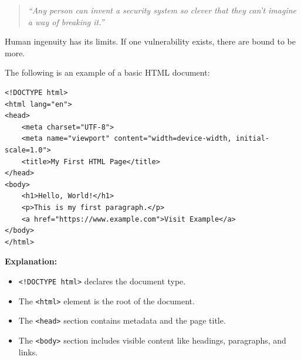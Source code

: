     \begin{theo}

        \label{theo:schneier}
        \begin{quote}
            \emph{``Any person can invent a security system so clever that they can't imagine a way of breaking it.''}
        \end{quote}

        \vspace{.5em}
        \noindent
        Human ingenuity has its limits. If one vulnerability exists, there are bound to be more. \hfill
    \end{theo}

    \newpage
    
\begin{Example}
The following is an example of a basic HTML document:

\begin{verbatim}
<!DOCTYPE html>
<html lang="en">
<head>
    <meta charset="UTF-8">
    <meta name="viewport" content="width=device-width, initial-scale=1.0">
    <title>My First HTML Page</title>
</head>
<body>
    <h1>Hello, World!</h1>
    <p>This is my first paragraph.</p>
    <a href="https://www.example.com">Visit Example</a>
</body>
</html>
\end{verbatim}

\noindent
\textbf{Explanation:}
\begin{itemize}
    \item \texttt{<!DOCTYPE html>} declares the document type.
    \item The \texttt{<html>} element is the root of the document.
    \item The \texttt{<head>} section contains metadata and the page title.
    \item The \texttt{<body>} section includes visible content like headings, paragraphs, and links.
\end{itemize}
\end{Example}

